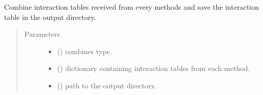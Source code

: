 \documentclass[letterpaper,10pt,english]{sphinxmanual}
\begin{document}
\begin{fulllineitems}
\label{\detokenize{_modules/cosifer.pipelines:cosifer.pipelines.pipeline_cli.run_combiner}}
Combine interaction tables received from every methods and
save the interaction table in the output directory.
\begin{quote}\begin{description}
\item[{Parameters}] \leavevmode\begin{itemize}
\item {} 
 () \textendash{} combiner type.

\item {} 
 () \textendash{} dictionary containing interaction
tables from each method.

\item {} 
 () \textendash{} path to the output directory.

\end{itemize}

\end{description}\end{quote}

\end{fulllineitems}

\end{document}
